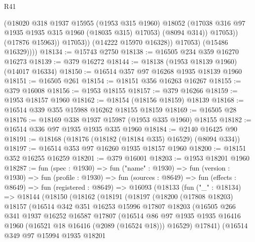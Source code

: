 \begin{lexlean}{R41}
\begin{coremodule}
                        (@18020
                          @318
                          @1937
                          @15955
                          (@1953 @315 @1960)
                          @18052
                          (@17038 @316 @97 @1935 @1935 @315 @1960 (@18035 @315) @17053)
                          (@8094 @314))
                        @17053))
                    (@17876 @15963))
                  @17053))
              (@14222 @15970 @16328))
            @17053)
          (@15486 @16329))))
@18134 := @15743 @2750
@18138 := @16505 @234 @359 @16270 @16273
@18139 := @379 @16272
@18144 := @18138 (@1953 @18139 @1960) (@14017 @16334)
@18150 := @16514 @357 @97 @16268 @1935 @18139 @1960
@18151 := @16505 @261
@18154 := @18151 @356 @16263 @16267
@18155 := @379 @16008
@18156 := @1953 @18155
@18157 := @379 @16266
@18159 := @1953 @18157 @1960
@18162 := @18154 (@18156 @18159) @18139
@18168 := @16514 @339 @355 @15988 @16262 @18155 @18159
@18169 := @16505 @28
@18176 := @18169 @338 @1937 @15987 (@1953 @335 @1960) @18155
@18182 := @16514 @336 @97 @1935 @1935 @335 @1960
@18184 := @2140 @16425 @90
@18191 := @18168 (@18176 (@18182 (@18184 @335) @16529) (@8094 @334))
@18197 := @16514 @353 @97 @16260 @1935 @18157 @1960
@18200 := @18151 @352 @16255 @16259
@18201 := @379 @16001
@18203 := @1953 @18201 @1960
@18287 := fun (spec : @1930) =>
  fun ("name" : @1930) =>
  fun (version : @1930) =>
  fun (profile : @1930) =>
  fun (sources : @8649) =>
  fun (effects : @8649) =>
  fun (registered : @8649) =>
  @16093
    (@18133
      (fun ("_" : @18134) =>
      @18144
        (@18150
          (@18162
            (@18191
              (@18197
                (@18200
                  (@17808 @18203)
                  @18157
                  (@16514
                    @342
                    @351
                    @16253
                    @15996
                    @17807
                    @18203
                    (@16505
                      @266
                      @341
                      @1937
                      @16252
                      @16587
                      @17807
                      (@16514
                        @86
                        @97
                        @1935
                        @1935
                        @16416
                        @1960
                        (@16521 @18 @16416 (@2089 (@16524 @18)))
                        @16529)
                      @17841)
                    (@16514
                      @349
                      @97
                      @15994
                      @1935
                      @18201

\end{coremodule}
\end{lexlean}
